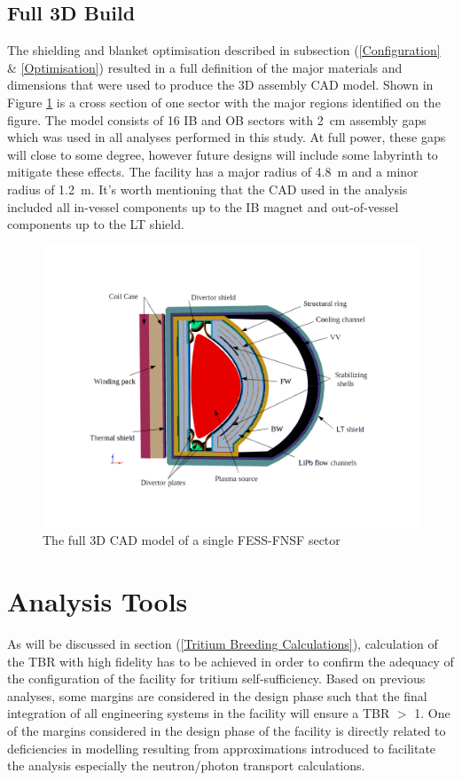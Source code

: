 \documentclass[12pt, letterpaper]{elsarticle}
\begin{document}
\subsection{Full 3D Build} \label{Full 3D Build}
The shielding and blanket optimisation described in subsection (\ref{Configuration} \& \ref{Optimisation}) resulted in a full definition of the major materials and dimensions that were used to produce the 3D assembly CAD model. Shown in Figure \ref{fig:Full3D} is a cross section of one sector with the major regions identified on the figure. The model consists of 16 IB and OB sectors with \SI{2}{cm} assembly gaps which was used in all analyses performed in this study. At full power, these gaps will close to some degree, however future designs will include some labyrinth to mitigate these effects. The facility has a major radius of \SI{4.8}{m} and a minor radius of \SI{1.2}{m}. It's worth mentioning that the CAD used in the analysis included all in-vessel components up to the IB magnet and out-of-vessel components up to the LT shield. 
\begin{figure}[h!]
  \centering
  \includegraphics[scale=0.35,clip]{../plots/full_3d.png}
  \caption{The full 3D CAD model of a single FESS-FNSF sector}
  \label{fig:Full3D}
\end{figure}

\section{Analysis Tools} \label{Analysis Tools}
As will be discussed in section (\ref{Tritium Breeding Calculations}), calculation of the TBR with high fidelity has to be achieved in order to confirm the adequacy of the configuration of the facility for tritium self-sufficiency. Based on previous analyses, some margins are considered in the design phase such that the final integration of all engineering systems in the facility will ensure a TBR $>$ 1. One of the margins \cite{ref_3} considered in the design phase of the facility is directly related to deficiencies in modelling resulting from approximations introduced to facilitate the analysis especially the neutron/photon transport calculations. \vspace{5mm}
\end{document}
